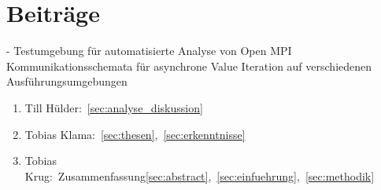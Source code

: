 \section{Beiträge}
\label{sec:beitraege}
- Testumgebung für automatisierte Analyse von Open MPI Kommunikationsschemata für asynchrone Value Iteration auf verschiedenen Ausführungsumgebungen

\begin{enumerate}
    \item Till Hülder:~\ref{sec:analyse_diskussion}
    \item Tobias Klama:~\ref{sec:thesen},~\ref{sec:erkenntnisse}
    \item Tobias Krug:~Zusammenfassung\ref{sec:abstract},~\ref{sec:einfuehrung},~\ref{sec:methodik}
\end{enumerate}
